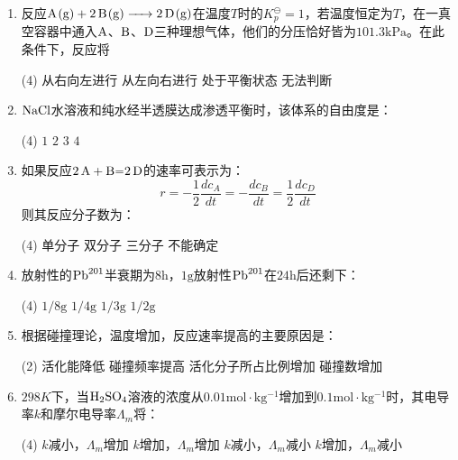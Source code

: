 \begin{enumerate}[label=\arabic*., itemsep=1.5ex]
    \begin{tasks}(2)
        \task 吸热反应
        \task 放热反应
        \task 无热量变化
        \task 视反应过程而定
    \end{tasks}
    \item 反应$\ce{A(g) + 2B(g) -> 2D(g)}$在温度$T$时的$K_p^\ominus=1$，若温度恒定为$T$，在一真空容器中通入$\ce{A}$、$\ce{B}$、$\ce{D}$三种理想气体，他们的分压恰好皆为$101.3\mathrm{kPa}$。在此条件下，反应将
    \begin{tasks}(4)
        \task 从右向左进行
        \task 从左向右进行
        \task 处于平衡状态
        \task 无法判断
    \end{tasks}
    \item $\ce{NaCl}$水溶液和纯水经半透膜达成渗透平衡时，该体系的自由度是：
    \begin{tasks}(4)
        \task $1$
        \task $2$
        \task $3$
        \task $4$
    \end{tasks}
    \item 如果反应$\ce{2A + B=2D}$的速率可表示为：
    \[
    r = -\frac{1}{2}\frac{dc_A}{dt} = -\frac{dc_B}{dt} = \frac{1}{2}\frac{dc_D}{dt}
    \]
    则其反应分子数为：
    \begin{tasks}(4)
        \task 单分子
        \task 双分子
        \task 三分子
        \task 不能确定
    \end{tasks}
    \item 放射性的$\ce{Pb^{201}}$半衰期为$8\mathrm{h}$，$1\mathrm{g}$放射性$\ce{Pb^{201}}$在$24\mathrm{h}$后还剩下：
    \begin{tasks}(4)
        \task $1/8\mathrm{g}$
        \task $1/4\mathrm{g}$
        \task $1/3\mathrm{g}$
        \task $1/2\mathrm{g}$
    \end{tasks}
    \item 根据碰撞理论，温度增加，反应速率提高的主要原因是：
    \begin{tasks}(2)
        \task 活化能降低
        \task 碰撞频率提高
        \task 活化分子所占比例增加
        \task 碰撞数增加
    \end{tasks}
    \item $298K$下，当$\ce{H_{2}SO_{4}}$溶液的浓度从$0.01\mathrm{mol\cdot kg^{-1}}$增加到$0.1\mathrm{mol\cdot kg^{-1}}$时，其电导率$k$和摩尔电导率$\Lambda_m$将：
    \begin{tasks}(4)
        \task $k$减小，$\Lambda_m$增加
        \task $k$增加，$\Lambda_m$增加
        \task $k$减小，$\Lambda_m$减小
        \task $k$增加，$\Lambda_m$减小
    \end{tasks}

\end{enumerate}
